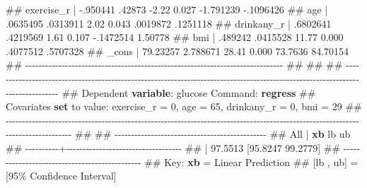\documentclass[
  letterpaper,
  DIV=11,
  numbers=noendperiod]{scrreprt}
\newenvironment{Shaded}{\begin{snugshade}}{\end{snugshade}}
\newcommand{\DataTypeTok}[1]{\textcolor[rgb]{0.68,0.00,0.00}{#1}}
\newcommand{\KeywordTok}[1]{\textcolor[rgb]{0.00,0.23,0.31}{\textbf{#1}}}
\newcommand{\NormalTok}[1]{\textcolor[rgb]{0.00,0.23,0.31}{#1}}
\newcommand{\OtherTok}[1]{\textcolor[rgb]{0.00,0.23,0.31}{#1}}
\begin{document}
\begin{Shaded}
\begin{Highlighting}[]
\NormalTok{\#\#   exercise\_r |   {-}.950441     .42873    {-}2.22   0.027    {-}1.791239   {-}.1096426}
\NormalTok{\#\#          age |   .0635495   .0313911     2.02   0.043     .0019872    .1251118}
\NormalTok{\#\#   drinkany\_r |   .6802641   .4219569     1.61   0.107    {-}.1472514     1.50778}
\NormalTok{\#\#          bmi |    .489242   .0415528    11.77   0.000     .4077512    .5707328}
\NormalTok{\#\#        }\DataTypeTok{\_cons}\NormalTok{ |   79.23257   2.788671    28.41   0.000      73.7636    84.70154}
\NormalTok{\#\# {-}{-}{-}{-}{-}{-}{-}{-}{-}{-}{-}{-}{-}{-}{-}{-}{-}{-}{-}{-}{-}{-}{-}{-}{-}{-}{-}{-}{-}{-}{-}{-}{-}{-}{-}{-}{-}{-}{-}{-}{-}{-}{-}{-}{-}{-}{-}{-}{-}{-}{-}{-}{-}{-}{-}{-}{-}{-}{-}{-}{-}{-}{-}{-}{-}{-}{-}{-}{-}{-}{-}{-}{-}{-}{-}{-}{-}{-}}
\NormalTok{\#\# }
\NormalTok{\#\# }
\NormalTok{\#\# {-}{-}{-}{-}{-}{-}{-}{-}{-}{-}{-}{-}{-}{-}{-}{-}{-}{-}{-}{-}{-}{-}{-}{-}{-}{-}{-}{-}{-}{-}{-}{-}{-}{-}{-}{-}{-}{-}{-}{-}{-}{-}{-}{-}{-}{-}{-}{-}{-}{-}{-}{-}{-}{-}{-}{-}{-}{-}{-}{-}{-}{-}{-}{-}{-}{-}{-}{-}{-}{-}{-}{-}{-}{-}{-}{-}{-}{-}{-}{-}{-}{-}{-}{-}{-}{-}{-}{-}{-}{-}{-}{-}{-}{-}{-}{-}{-}{-}{-}{-}{-}{-}{-}{-}{-}{-}{-}{-}{-}{-}{-}{-}{-}{-}{-}{-}{-}{-}{-}{-}{-}{-}{-}{-}{-}{-}{-}}
\NormalTok{\#\#      Dependent }\KeywordTok{variable}\NormalTok{: glucose     Command: }\KeywordTok{regress}
\NormalTok{\#\# Covariates }\KeywordTok{set}\NormalTok{ to }\OtherTok{value}\NormalTok{: exercise\_r = 0, age = 65, drinkany\_r = 0, bmi = 29}
\NormalTok{\#\# {-}{-}{-}{-}{-}{-}{-}{-}{-}{-}{-}{-}{-}{-}{-}{-}{-}{-}{-}{-}{-}{-}{-}{-}{-}{-}{-}{-}{-}{-}{-}{-}{-}{-}{-}{-}{-}{-}{-}{-}{-}{-}{-}{-}{-}{-}{-}{-}{-}{-}{-}{-}{-}{-}{-}{-}{-}{-}{-}{-}{-}{-}{-}{-}{-}{-}{-}{-}{-}{-}{-}{-}{-}{-}{-}{-}{-}{-}{-}{-}{-}{-}{-}{-}{-}{-}{-}{-}{-}{-}{-}{-}{-}{-}{-}{-}{-}{-}{-}{-}{-}{-}{-}{-}{-}{-}{-}{-}{-}{-}{-}{-}{-}{-}{-}{-}{-}{-}{-}{-}{-}{-}{-}{-}{-}{-}{-}}
\NormalTok{\#\# }
\NormalTok{\#\# {-}{-}{-}{-}{-}{-}{-}{-}{-}{-}{-}{-}{-}{-}{-}{-}{-}{-}{-}{-}{-}{-}{-}{-}{-}{-}{-}{-}{-}{-}{-}{-}{-}{-}{-}{-}{-}{-}{-}{-}{-}{-}{-}{-}{-}{-}}
\NormalTok{\#\#       All |         }\KeywordTok{xb}\NormalTok{          lb          ub}
\NormalTok{\#\# {-}{-}{-}{-}{-}{-}{-}{-}{-}{-}+{-}{-}{-}{-}{-}{-}{-}{-}{-}{-}{-}{-}{-}{-}{-}{-}{-}{-}{-}{-}{-}{-}{-}{-}{-}{-}{-}{-}{-}{-}{-}{-}{-}{-}{-}}
\NormalTok{\#\#           |    97.5513    [95.8247    99.2779]}
\NormalTok{\#\# {-}{-}{-}{-}{-}{-}{-}{-}{-}{-}{-}{-}{-}{-}{-}{-}{-}{-}{-}{-}{-}{-}{-}{-}{-}{-}{-}{-}{-}{-}{-}{-}{-}{-}{-}{-}{-}{-}{-}{-}{-}{-}{-}{-}{-}{-}}
\NormalTok{\#\#      Key:  }\KeywordTok{xb}\NormalTok{         =  Linear Prediction}
\NormalTok{\#\#            [lb , ub]  =  [95\% Confidence Interval]}
\end{Highlighting}
\end{Shaded}
\end{document}
